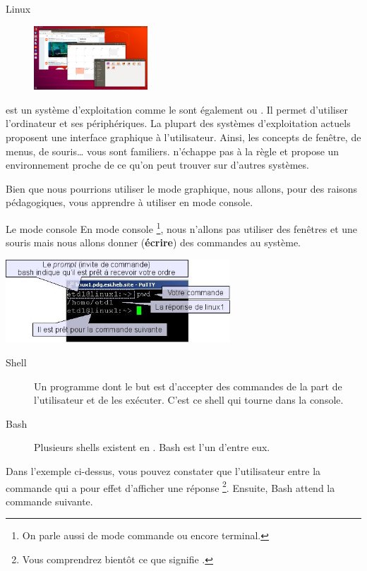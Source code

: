 \documentclass[a4paper,11pt]{style-esi/td}
\begin{document}
		\begin{theorie}{Linux}
			\begin{figure} 
				\vspace{-1em}
				\flushright
				\includegraphics[width=0.38\textwidth]{images/ubuntu}
				\caption{}
				\vspace{-1em}
			\end{figure} 
			 est un système d'exploitation comme le sont 
			également  ou . 
			Il permet d'utiliser l'ordinateur et ses périphériques. 
			La plupart des systèmes d'exploitation actuels proposent 
			une interface graphique à l'utilisateur. 
			Ainsi, les concepts de fenêtre, de menus, de souris\dots{} vous sont familiers. 
			 n'échappe pas à la règle et propose un environnement 
			proche de ce qu'on peut trouver sur d'autres systèmes.
		\end{theorie}

		Bien que nous pourrions utiliser le mode graphique, 
		nous allons, pour des raisons pédagogiques, 
		vous apprendre à utiliser  en mode console.

		\begin{theorie}{Le mode console}
			En mode console%
			\footnote{%
				On parle aussi de mode \og{}commande\fg{} ou encore \og{}terminal\fg{}.
			}, 
			nous n'allons pas utiliser des fenêtres et une souris 
			mais nous allons donner (\textbf{écrire}) des commandes au système.
			
			\medskip
			\begin{center}
			\includegraphics[width=0.63\textwidth]{images/console}
			\end{center}
			\begin{description}
			\item[Shell] 
				Un programme dont le but 
				est d'accepter des commandes de la part de l'utilisateur 
				et de les exécuter. 
				C'est ce shell qui tourne dans la console.
			\item[Bash] 
				Plusieurs shells existent en . Bash est l'un d'entre eux.
			\end{description} 
			Dans l'exemple ci-dessus, 
			vous pouvez constater que l'utilisateur entre la commande   
			qui a pour effet d'afficher une réponse%
			\footnote{%
				Vous comprendrez bientôt ce que signifie .
			}. 
			Ensuite, Bash attend la commande suivante.
		\end{theorie}
\end{document}

